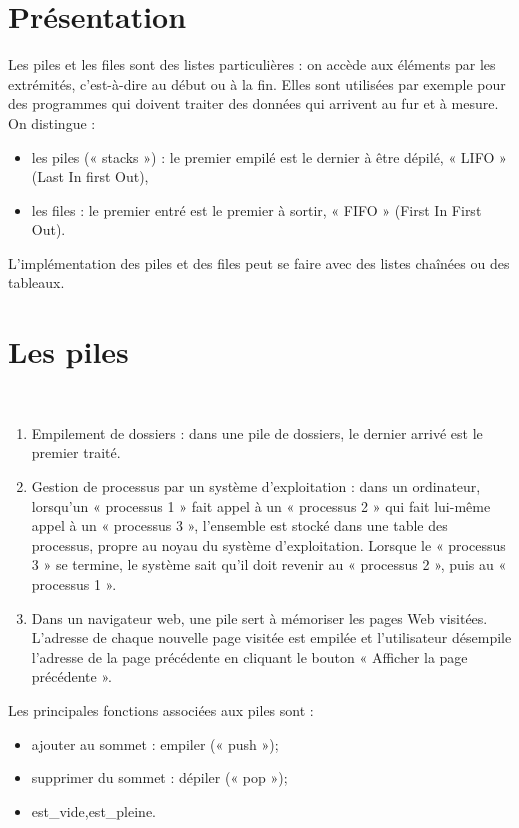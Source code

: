 \documentclass[10pt,fleqn]{article} %
\begin{document}


\section{Présentation}
Les piles et les files sont des listes particulières : on accède aux éléments par les extrémités, c'est-à-dire au début ou à la fin.
Elles sont utilisées par exemple pour des programmes qui doivent traiter des données qui arrivent au fur et à mesure.
On distingue :
\begin{itemize}
\item les piles (« stacks ») : le premier empilé est le dernier à être dépilé, « LIFO » (Last In first Out),
\item les files : le premier entré est le premier à sortir, « FIFO » (First In First Out).
\end{itemize}
L’implémentation des piles et des files peut se faire avec des listes chaînées ou des tableaux.

\section{Les piles}
\begin{exemple}
~\\
\begin{enumerate}
\item Empilement de dossiers : dans une pile de dossiers, le dernier arrivé est le premier traité.

\item Gestion de processus par un système d’exploitation : dans un ordinateur, lorsqu’un « processus 1 » fait appel à un « processus 2 » qui fait lui-même appel à un « processus 3 », l’ensemble est stocké dans une table des processus, propre au noyau du système d’exploitation. Lorsque le « processus 3 » se termine, le système sait qu’il doit revenir au « processus 2 », puis au « processus 1 ». 
\item Dans un navigateur web, une pile sert à mémoriser les pages Web visitées. L'adresse de chaque nouvelle page visitée est empilée et l'utilisateur désempile l'adresse de la page précédente en cliquant le bouton « Afficher la page précédente ».
\end{enumerate}
\end{exemple}

\begin{rem}
Les principales fonctions associées aux piles sont : 
\begin{itemize}
\item ajouter au sommet : empiler (« push »);
\item supprimer du sommet : dépiler (« pop »);
\item est\_vide,est\_pleine.
\end{itemize}
\end{rem}
\end{document}
